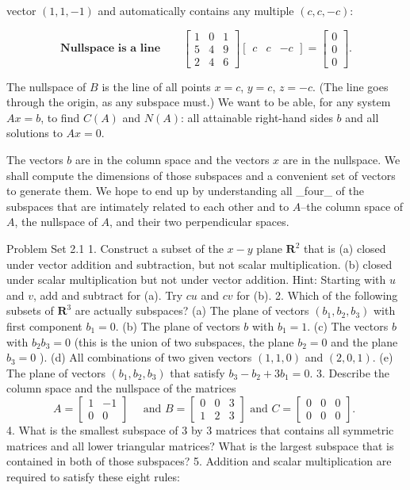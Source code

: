 vector \((1,1,-1)\) and automatically contains any multiple \((c,c,-c)\):

\[\textbf{Nullspace is a line}\qquad\begin{bmatrix}1&0&1\\ 5&4&9\\ 2&4&6\end{bmatrix}\begin{bmatrix}c&c&-c\end{bmatrix}=\begin{bmatrix}0\\ 0\\ 0\end{bmatrix}.\]

The nullspace of \(B\) is the line of all points \(x=c\), \(y=c\), \(z=-c\). (The line goes through the origin, as any subspace must.) We want to be able, for any system \(Ax=b\), to find \(C(A)\) and \(N(A)\): all attainable right-hand sides \(b\) and all solutions to \(Ax=0\).

The vectors \(b\) are in the column space and the vectors \(x\) are in the nullspace. We shall compute the dimensions of those subspaces and a convenient set of vectors to generate them. We hope to end up by understanding all _four_ of the subspaces that are intimately related to each other and to \(A\)--the column space of \(A\), the nullspace of \(A\), and their two perpendicular spaces.

Problem Set 2.1
1. Construct a subset of the $x-y$ plane $\mathbf{R}^2$ that is
(a) closed under vector addition and subtraction, but not scalar multiplication.
(b) closed under scalar multiplication but not under vector addition.
Hint: Starting with $u$ and $v$, add and subtract for (a). Try $c u$ and $c v$ for (b).
2. Which of the following subsets of $\mathbf{R}^3$ are actually subspaces?
(a) The plane of vectors $\left(b_1, b_2, b_3\right)$ with first component $b_1=0$.
(b) The plane of vectors $b$ with $b_1=1$.
(c) The vectors $b$ with $b_2 b_3=0$ (this is the union of two subspaces, the plane $b_2=0$ and the plane $b_3=0$ ).
(d) All combinations of two given vectors $(1,1,0)$ and $(2,0,1)$.
(e) The plane of vectors $\left(b_1, b_2, b_3\right)$ that satisfy $b_3-b_2+3 b_1=0$.
3. Describe the column space and the nullspace of the matrices
$$
A=\left[\begin{array}{cc}
1 & -1 \\
0 & 0
\end{array}\right] \quad \text { and } B=\left[\begin{array}{lll}
0 & 0 & 3 \\
1 & 2 & 3
\end{array}\right] \text { and } C=\left[\begin{array}{lll}
0 & 0 & 0 \\
0 & 0 & 0
\end{array}\right] \text {. }
$$
4. What is the smallest subspace of 3 by 3 matrices that contains all symmetric matrices and all lower triangular matrices? What is the largest subspace that is contained in both of those subspaces?
5. Addition and scalar multiplication are required to satisfy these eight rules:
 
